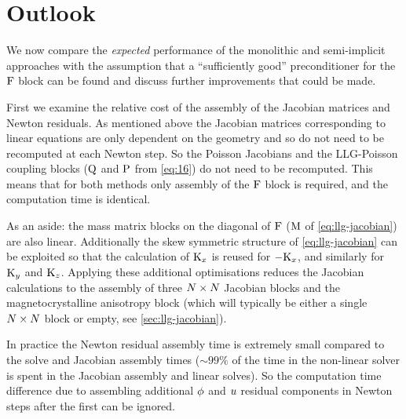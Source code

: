


\section{Outlook}
\label{sec:furth-optim-opport}

We now compare the \emph{expected} performance of the monolithic and semi-implicit approaches with the assumption that a ``sufficiently good'' preconditioner for the $\mathrm{F}$ block can be found and discuss further improvements that could be made.

First we examine the relative cost of the assembly of the Jacobian matrices and Newton residuals.
As mentioned above the Jacobian matrices corresponding to linear equations are only dependent  on the geometry and so do not need to be recomputed at each Newton step.
So the Poisson Jacobians and the LLG-Poisson coupling blocks ($\mathrm{Q}$ and $\mathrm{P}$ from \cref{eq:16}) do not need to be recomputed.
This means that for both methods only assembly of the $\mathrm{F}$ block is required, and the computation time is identical.

As an aside: the mass matrix blocks on the diagonal of $\mathrm{F}$ ($\mathrm{M}$ of \cref{eq:llg-jacobian}) are also linear.
Additionally the skew symmetric structure of \cref{eq:llg-jacobian} can be exploited so that the calculation of $\mathrm{K}_x$ is reused for $-\mathrm{K}_x$, and similarly for $\mathrm{K}_y$ and $\mathrm{K}_z$.
Applying these additional optimisations reduces the Jacobian calculations to the assembly of three $N \times N$ Jacobian blocks and the magnetocrystalline anisotropy block (which will typically be either a single $N \times N$ block or empty, see \cref{sec:llg-jacobian}).

In practice the Newton residual assembly time is extremely small compared to the solve and Jacobian assembly times ($\sim 99 \%$ of the time in the non-linear solver is spent in the Jacobian assembly and linear solves).
So the computation time difference due to assembling additional $\phi$ and $u$ residual components in Newton steps after the first can be ignored.

